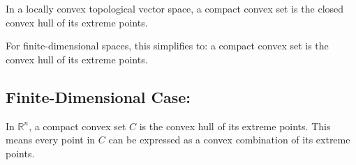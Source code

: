 In a locally convex topological vector space, a compact convex set is the closed convex hull of its extreme points.

For finite-dimensional spaces, this simplifies to: a compact convex set is the convex hull of its extreme points.

\subsection*{Finite-Dimensional Case:}

In \(\mathbb{R}^n\), a compact convex set \(C\) is the convex hull of its extreme points. This means every point in \(C\) can be expressed as a convex combination of its extreme points.